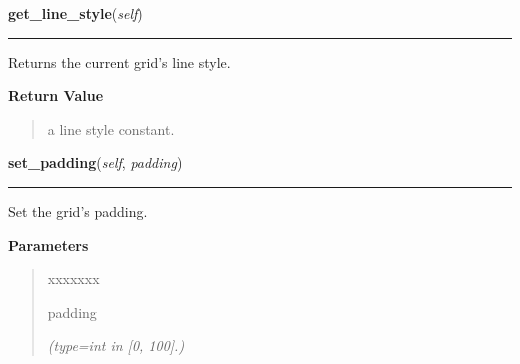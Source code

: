 \hspace{.8\funcindent}\begin{boxedminipage}{\funcwidth}

    \raggedright \textbf{get\_line\_style}(\textit{self})

    \vspace{-1.5ex}

    \rule{\textwidth}{0.5\fboxrule}
\setlength{\parskip}{2ex}
    Returns the current grid's line style.

\setlength{\parskip}{1ex}
      \textbf{Return Value}
    \vspace{-1ex}

      \begin{quote}
      a line style constant.

      \end{quote}

    \end{boxedminipage}

    \label{pygtk_chart:bar_chart:Grid:set_padding}

    \vspace{0.5ex}

\hspace{.8\funcindent}\begin{boxedminipage}{\funcwidth}

    \raggedright \textbf{set\_padding}(\textit{self}, \textit{padding})

    \vspace{-1.5ex}

    \rule{\textwidth}{0.5\fboxrule}
\setlength{\parskip}{2ex}
    Set the grid's padding.

\setlength{\parskip}{1ex}
      \textbf{Parameters}
      \vspace{-1ex}

      \begin{quote}
        \begin{Ventry}{xxxxxxx}

          \item[padding]

            {\it (type=int in [0, 100].)}

        \end{Ventry}

      \end{quote}

    \end{boxedminipage}

